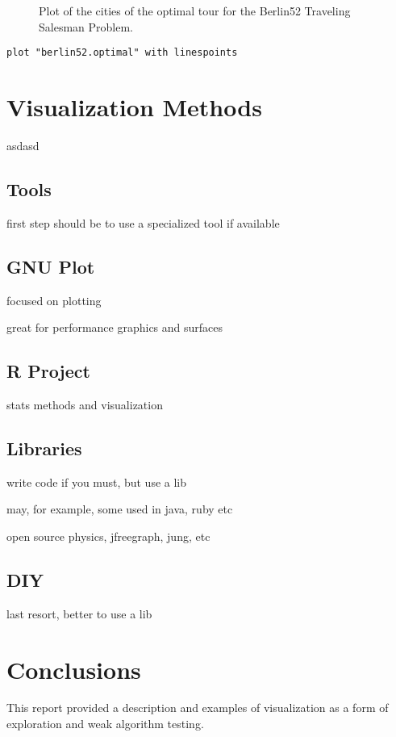 \documentclass[a4paper, 11pt]{article}
\begin{document}
\begin{figure}[htp]

\caption{Plot of the cities of the optimal tour for the Berlin52 Traveling Salesman Problem.}
\label{plot:tsp2}
\end{figure}

\begin{lstlisting}[caption=Gnuplot script for plotting a tour for a Traveling Salesman Problem., label=tsp2]
plot "berlin52.optimal" with linespoints
\end{lstlisting}


%
%
\section{Visualization Methods}
asdasd

\subsection{Tools}
first step should be to use a specialized tool if available

\subsection{GNU Plot}
focused on plotting

great for performance graphics and surfaces

\subsection{R Project}
stats methods and visualization


\subsection{Libraries}
write code if you must, but use a lib

may, for example, some used in java, ruby etc

open source physics, jfreegraph, jung, etc


\subsection{DIY}
last resort, better to use a lib


%
%
\section{Conclusions}
\label{sec:conclusions}
This report provided a description and examples of visualization as a form of exploration and weak algorithm testing. 



\end{document}
